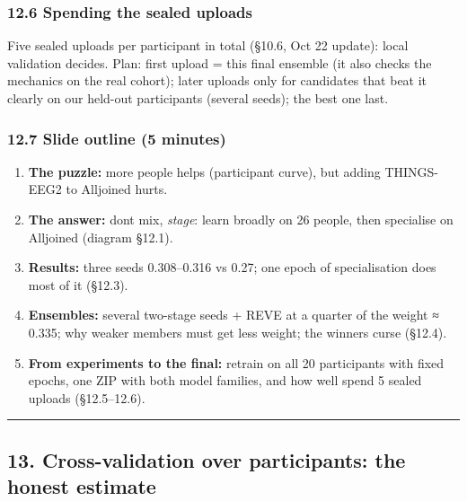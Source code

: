 \documentclass[
  11pt,
]{article}
\providecommand{\tightlist}{%
  \setlength{\itemsep}{0pt}\setlength{\parskip}{0pt}}
\renewcommand{\_}{\oldunderscore\allowbreak}
\begin{document}
\subsubsection{12.6 Spending the sealed
uploads}\label{spending-the-sealed-uploads}

Five sealed uploads per participant in
total (§10.6, Oct 22 update): local
validation decides. Plan: first upload =
this final ensemble (it also checks the
mechanics on the real cohort); later
uploads only for candidates that beat it
clearly on our held-out participants
(several seeds); the best one last.

\subsubsection{12.7 Slide outline (5
minutes)}\label{slide-outline-5-minutes}

\begin{enumerate}
\def\labelenumi{\arabic{enumi}.}
\tightlist
\item
  \textbf{The puzzle:} more people helps
  (participant curve), but adding
  THINGS-EEG2 to Alljoined hurts.
\item
  \textbf{The answer:}
  don\textquotesingle t mix,
  \emph{stage}: learn broadly on 26
  people, then specialise on Alljoined
  (diagram §12.1).
\item
  \textbf{Results:} three seeds
  0.308--0.316 vs 0.27; one epoch of
  specialisation does most of it
  (§12.3).
\item
  \textbf{Ensembles:} several two-stage
  seeds + REVE at a quarter of the
  weight ≈ 0.335; why weaker members
  must get less weight; the
  winner\textquotesingle s curse
  (§12.4).
\item
  \textbf{From experiments to the
  final:} retrain on all 20 participants
  with fixed epochs, one ZIP with both
  model families, and how
  we\textquotesingle ll spend 5 sealed
  uploads (§12.5--12.6).
\end{enumerate}

\begin{center}\rule{0.5\linewidth}{0.5pt}\end{center}

\subsection{13. Cross-validation over
participants: the honest
estimate}\label{cross-validation-over-participants-the-honest-estimate}
\end{document}
